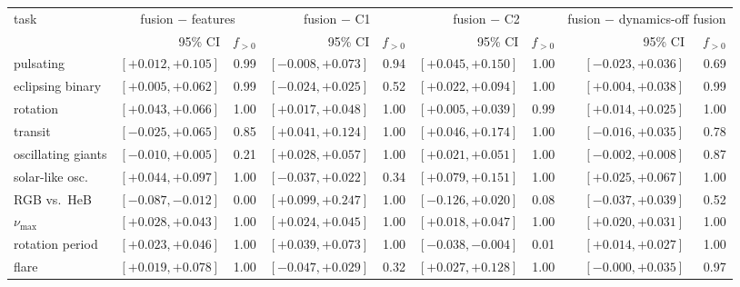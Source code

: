 \begin{tabular}{lrrrrrrrr}
\toprule
task & \multicolumn{2}{c}{fusion $-$ features} & \multicolumn{2}{c}{fusion $-$ C1} & \multicolumn{2}{c}{fusion $-$ C2} & \multicolumn{2}{c}{fusion $-$ dynamics-off fusion} \\
 & 95\% CI & $f_{>0}$ & 95\% CI & $f_{>0}$ & 95\% CI & $f_{>0}$ & 95\% CI & $f_{>0}$ \\
\midrule
pulsating & $\mathbf{[+0.012, +0.105]}$ & 0.99 & $[-0.008, +0.073]$ & 0.94 & $\mathbf{[+0.045, +0.150]}$ & 1.00 & $[-0.023, +0.036]$ & 0.69 \\
eclipsing binary & $\mathbf{[+0.005, +0.062]}$ & 0.99 & $[-0.024, +0.025]$ & 0.52 & $\mathbf{[+0.022, +0.094]}$ & 1.00 & $\mathbf{[+0.004, +0.038]}$ & 0.99 \\
rotation & $\mathbf{[+0.043, +0.066]}$ & 1.00 & $\mathbf{[+0.017, +0.048]}$ & 1.00 & $\mathbf{[+0.005, +0.039]}$ & 0.99 & $\mathbf{[+0.014, +0.025]}$ & 1.00 \\
transit & $[-0.025, +0.065]$ & 0.85 & $\mathbf{[+0.041, +0.124]}$ & 1.00 & $\mathbf{[+0.046, +0.174]}$ & 1.00 & $[-0.016, +0.035]$ & 0.78 \\
oscillating giants & $[-0.010, +0.005]$ & 0.21 & $\mathbf{[+0.028, +0.057]}$ & 1.00 & $\mathbf{[+0.021, +0.051]}$ & 1.00 & $[-0.002, +0.008]$ & 0.87 \\
solar-like osc. & $\mathbf{[+0.044, +0.097]}$ & 1.00 & $[-0.037, +0.022]$ & 0.34 & $\mathbf{[+0.079, +0.151]}$ & 1.00 & $\mathbf{[+0.025, +0.067]}$ & 1.00 \\
RGB vs.\ HeB & $\mathbf{[-0.087, -0.012]}$ & 0.00 & $\mathbf{[+0.099, +0.247]}$ & 1.00 & $[-0.126, +0.020]$ & 0.08 & $[-0.037, +0.039]$ & 0.52 \\
$\nu_{\max}$ & $\mathbf{[+0.028, +0.043]}$ & 1.00 & $\mathbf{[+0.024, +0.045]}$ & 1.00 & $\mathbf{[+0.018, +0.047]}$ & 1.00 & $\mathbf{[+0.020, +0.031]}$ & 1.00 \\
rotation period & $\mathbf{[+0.023, +0.046]}$ & 1.00 & $\mathbf{[+0.039, +0.073]}$ & 1.00 & $\mathbf{[-0.038, -0.004]}$ & 0.01 & $\mathbf{[+0.014, +0.027]}$ & 1.00 \\
flare & $\mathbf{[+0.019, +0.078]}$ & 1.00 & $[-0.047, +0.029]$ & 0.32 & $\mathbf{[+0.027, +0.128]}$ & 1.00 & $[-0.000, +0.035]$ & 0.97 \\
\bottomrule
\end{tabular}
